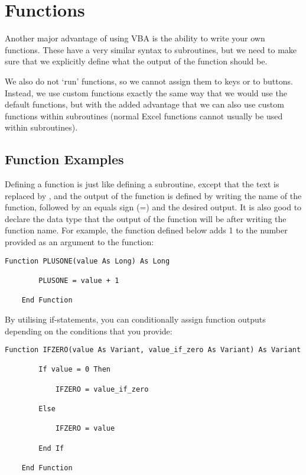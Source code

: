 \documentclass[11pt]{article}%
\begin{document}

\section{Functions}

Another major advantage of using VBA is the ability to write your own functions. These have a very similar syntax to subroutines, but we need to make sure that we explicitly define what the output of the function should be.

We also do not `run' functions, so we cannot assign them to keys or to buttons. Instead, we use custom functions exactly the same way that we would use the default functions, but with the added advantage that we can also use custom functions within subroutines (normal Excel functions cannot usually be used within subroutines).


\subsection{Function Examples}

Defining a function is just like defining a subroutine, except that the  text is replaced by , and the output of the function is defined by writing the name of the function, followed by an equals sign (=) and the desired output. It is also good to declare the data type that the output of the function will be after writing the function name. For example, the function defined below adds 1 to the number provided as an argument to the function:\\

\begin{lstlisting}[style=A]
    Function PLUSONE(value As Long) As Long

        PLUSONE = value + 1

    End Function
\end{lstlisting}

By utilising if-statements, you can conditionally assign function outputs depending on the conditions that you provide:\\

\begin{lstlisting}[style=A]
    Function IFZERO(value As Variant, value_if_zero As Variant) As Variant

        If value = 0 Then

            IFZERO = value_if_zero

        Else

            IFZERO = value

        End If

    End Function
\end{lstlisting}
\end{document}
